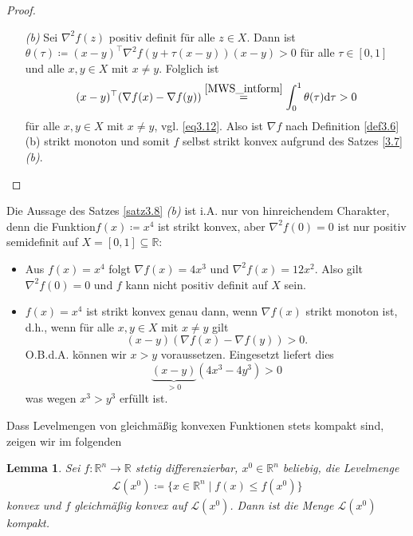\documentclass[a4paper,reqno]{amsart}
\newtheorem{lemma}[theorem]{Lemma}
\theoremstyle{definition}
\theoremstyle{remark}
\newcommand{\dd}{\textnormal{d}}
\begin{document}
\begin{proof}
\begin{itemize}
\item[\emph{(b)}] Sei $\nabla^2 f(z)$ positiv definit für alle $z\in X$.
    Dann ist $\theta(\tau)\coloneqq (x-y)^\top\nabla^2 f(y+\tau(x-y))(x-y)>0$
    für alle $\tau\in[0,1]$ und alle $x,y\in X$ mit $x\neq y$. Folglich
    ist
    \begin{align}
        (x-y)^\top(\nabla f(x)-\nabla f(y))
        \stackrel{\eqref{MWS_intform}}{=} \int_0^1 \theta(\tau)\dd \tau>0
    \end{align}
    für alle $x,y\in X$ mit $x\neq y$, vgl. \eqref{eq3.12}. Also ist
    $\nabla f$ nach Definition \ref{def3.6} (b) strikt monoton und
    somit $f$ selbst strikt konvex aufgrund
    des Satzes \ref{3.7} \emph{(b)}.
    \end{itemize}
\end{proof}

Die Aussage des Satzes \ref{satz3.8} \emph{(b)} ist i.A. nur von
hinreichendem Charakter, denn die Funktion$f(x)\coloneqq x^4$ ist strikt
konvex, aber $\nabla^2 f(0)=0$ ist nur positiv semidefinit auf
$X=[0,1]\subseteq\mathbb{R}$:
\begin{itemize}
    \item Aus $f(x)=x^4$ folgt $\nabla f(x)=4x^3$ und $\nabla^2 f(x)=12x^2$.
    Also gilt $\nabla^2 f(0)=0$ und $f$ kann nicht positiv definit auf
    $X$ sein.
    \item $f(x)=x^4$ ist strikt konvex genau dann, wenn $\nabla f(x)$
    strikt monoton ist, d.h., wenn für alle $x,y\in X$ mit $x\neq y$ gilt
    $$
    (x-y)(\nabla f(x)-\nabla f(y))>0.
    $$
    O.B.d.A. können wir $x>y$ voraussetzen. Eingesetzt liefert dies
    $$
        \underbrace{(x-y)}_{>0}(4x^3-4y^3)>0
    $$
    was wegen $x^3>y^3$ erfüllt ist.
\end{itemize}

Dass Levelmengen von gleichmäßig konvexen Funktionen stets kompakt sind,
zeigen wir im folgenden

\begin{lemma}\label{lemma3.9}%
    Sei $f\colon \mathbb{R}^n\to\mathbb{R}$ stetig differenzierbar, $x^0\in\mathbb{R}^n$
    beliebig, die Levelmenge
    \begin{align}
        \mathscr{L}(x^0)
        \coloneqq
        \{ x\in\mathbb{R}^n \mid f(x)\leq f(x^0) \}
    \end{align}
    konvex und $f$ gleichmäßig konvex auf $\mathscr{L}(x^0)$. Dann ist
    die Menge $\mathscr{L}(x^0)$ kompakt.
\end{lemma}
\end{document}
